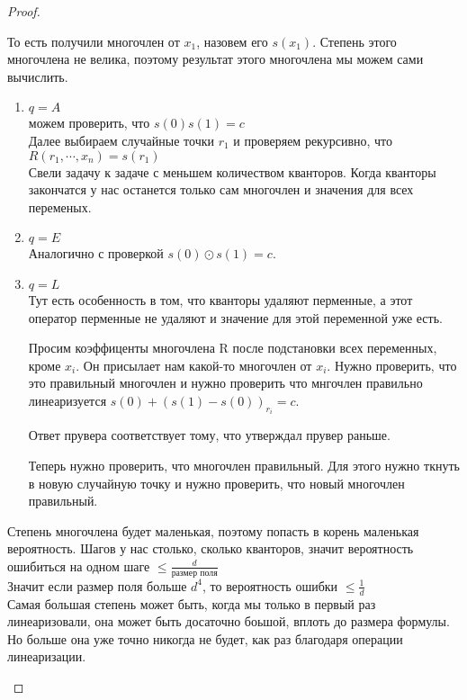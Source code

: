 \begin{proof}
\begin{description}
		То есть получили многочлен от $x_1$, назовем его $s(x_1)$. 
		Степень этого многочлена не велика, поэтому результат этого многочлена мы можем сами вычислить. 
		\begin{enumerate}
		\item $q = A$\\ 
        		можем проверить, что $s(0)s(1) = c$ \\
        		Далее выбираем случайные точки $r_1$ и проверяем рекурсивно, 
        		что $R(r_1, \cdots, x_n) = s(r_1)$\\

        		Свели задачу к задаче с меньшем количеством кванторов.
        		Когда кванторы закончатся у нас останется
        		только сам многочлен и значения для всех переменых.  
		\item $q = E$\\
        		Аналогично с проверкой $s(0) \odot s(1) = c$. 
		\item $q = L$\\
       			Тут есть особенность в том, что кванторы
       			удаляют перменные, а этот оператор перменные не
       			удаляют и значение для этой переменной уже есть.

       			Просим коэффиценты многочлена R после подстановки всех 
       			переменных, кроме $x_i$. Он присылает нам какой-то 
       			многочлен от $x_i$. Нужно проверить, что
		       	это правильный многочлен и нужно проверить что
			мнгочлен правильно линеаризуется $s(0) + (s(1) - s(0))_{r_i} = c$. 

       			Ответ прувера соответствует тому, что утверждал прувер раньше.

      			Теперь нужно проверить, что многочлен правильный. Для этого нужно
      			ткнуть в новую случайную точку и нужно проверить, что новый многочлен правильный.  
                    
		\end{enumerate}

		Степень многочлена будет маленькая, 
		поэтому попасть в корень маленькая вероятность. Шагов 
		у нас столько, сколько кванторов, 
		значит вероятность ошибиться на одном шаге $\le \frac{d}{\text{размер поля}}$\\

		Значит если размер поля больше $d^4$, то вероятность ошибки $\le \frac{1}{d}$\\

		Самая большая степень может быть, когда мы только в первый раз линеаризовали, 
		она может быть досаточно боьшой, вплоть до размера формулы. Но больше она уже 
		точно никогда не будет, как раз благодаря операции линеаризации. 
	\end{description}
\end{proof}

